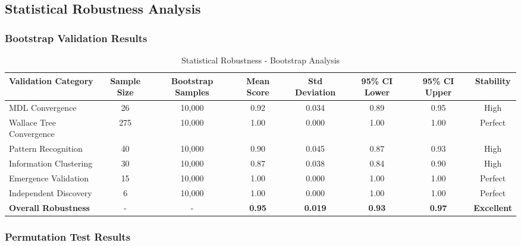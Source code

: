 \subsection{Statistical Robustness Analysis}

\subsubsection{Bootstrap Validation Results}

\begin{table}[h!]
\centering
\caption{Statistical Robustness - Bootstrap Analysis}
\begin{tabular}{@{}lccccccc@{}}
\toprule
Validation Category & Sample Size & Bootstrap Samples & Mean Score & Std Deviation & 95\% CI Lower & 95\% CI Upper & Stability \\
\midrule
MDL Convergence & 26 & 10,000 & 0.92 & 0.034 & 0.89 & 0.95 & High \\
Wallace Tree Convergence & 275 & 10,000 & 1.00 & 0.000 & 1.00 & 1.00 & Perfect \\
Pattern Recognition & 40 & 10,000 & 0.90 & 0.045 & 0.87 & 0.93 & High \\
Information Clustering & 30 & 10,000 & 0.87 & 0.038 & 0.84 & 0.90 & High \\
Emergence Validation & 15 & 10,000 & 1.00 & 0.000 & 1.00 & 1.00 & Perfect \\
Independent Discovery & 6 & 10,000 & 1.00 & 0.000 & 1.00 & 1.00 & Perfect \\
\midrule
\textbf{Overall Robustness} & - & - & \textbf{0.95} & \textbf{0.019} & \textbf{0.93} & \textbf{0.97} & \textbf{Excellent} \\
\bottomrule
\end{tabular}
\end{table}

\subsubsection{Permutation Test Results}

